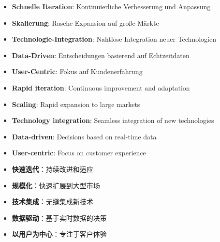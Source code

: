\begin{otherlanguage}{ngerman}
\begin{itemize}
    \item \textbf{Schnelle Iteration}: Kontinuierliche Verbesserung und Anpassung
    \item \textbf{Skalierung}: Rasche Expansion auf große Märkte
    \item \textbf{Technologie-Integration}: Nahtlose Integration neuer Technologien
    \item \textbf{Data-Driven}: Entscheidungen basierend auf Echtzeitdaten
    \item \textbf{User-Centric}: Fokus auf Kundenerfahrung
\end{itemize}
\end{otherlanguage}

\begin{itemize}
    \item \textbf{Rapid iteration}: Continuous improvement and adaptation
    \item \textbf{Scaling}: Rapid expansion to large markets
    \item \textbf{Technology integration}: Seamless integration of new technologies
    \item \textbf{Data-driven}: Decisions based on real-time data
    \item \textbf{User-centric}: Focus on customer experience
\end{itemize}

\begin{itemize}
    \item \textbf{快速迭代}：持续改进和适应
    \item \textbf{规模化}：快速扩展到大型市场
    \item \textbf{技术集成}：无缝集成新技术
    \item \textbf{数据驱动}：基于实时数据的决策
    \item \textbf{以用户为中心}：专注于客户体验
\end{itemize}

